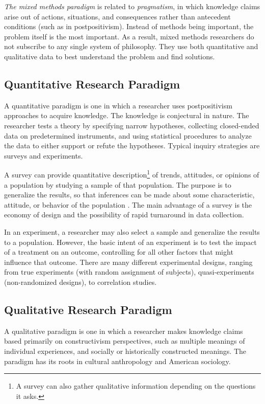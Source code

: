 \textit{The mixed methods paradigm} is related to \textit{pragmatism}, in which knowledge claims arise out of actions, situations, and consequences rather than antecedent conditions (such as in postpositivism). Instead of methods being important, the problem itself is the most important. As a result, mixed methods researchers do not subscribe to any single system of philosophy. They use both quantitative and qualitative data to best understand the problem and find solutions.


\subsection{Quantitative Research Paradigm}

A quantitative paradigm is one in which a researcher uses postpositivism approaches to acquire knowledge. The knowledge is conjectural in nature. The researcher tests a theory by specifying narrow hypotheses, collecting closed-ended data on predetermined instruments, and using statistical procedures to analyze the data to either support or refute the hypotheses. Typical inquiry strategies are surveys and experiments.

A survey can provide quantitative description\footnote{A survey can also gather qualitative information depending on the questions it asks.} of trends, attitudes, or opinions of a population by studying a sample of that population. The purpose is to generalize the results, so that inferences can be made about some characteristic, attitude, or behavior of the population \cite{Babbie:1990}. The main advantage of a survey is the economy of design and the possibility of rapid turnaround in data collection. 

In an experiment, a researcher may also select a sample and generalize the results to a population. However, the basic intent of an experiment is to test the impact of a treatment on an outcome, controlling for all other factors that might influence that outcome. There are many different experimental designs, ranging from true experiments (with random assignment of subjects), quasi-experiments (non-randomized designs), to correlation studies. 


\subsection{Qualitative Research Paradigm}

A qualitative paradigm is one in which a researcher makes knowledge claims based primarily on constructivism perspectives, such as multiple meanings of individual experiences, and socially or historically constructed meanings. The paradigm has its roots in cultural anthropology and American sociology. 


